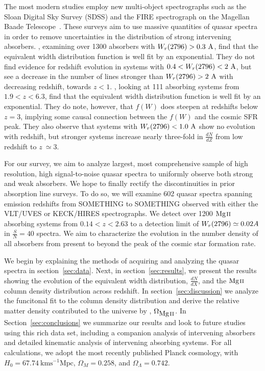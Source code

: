 \documentclass[iop,apj,numberedappendix,appendixfloats,twocolappendix]{emulateapj}
\begin{document}
The most modern studies employ new multi-object spectrographs such as the Sloan Digital Sky Survey (SDSS) and the FIRE spectrograph on the Magellan Baade Telescope~\citep{Nestor2005,Matejek2012}. These surveys aim to use massive quantities of quasar spectra in order to remove uncertainties in the distribution of strong intervening absorbers. \cite{Nestor2005}, examining over 1300 {\MgII} absorbers with $W_r(2796) > 0.3~\mathrm{\AA}$, find that the equivalent width distribution function is well fit by an exponential. They do not find evidence for redshift evolution in systems with $0.4 < W_r(2796) < 2~\mathrm{\AA}$, but see a decrease in the number of lines stronger than $W_r(2796) > 2~\mathrm{\AA}$ with decreasing redshift, towards $z < 1$. \cite{Matejek2012}, looking at 111 {\MgII} absorbing systems from $1.9 < z < 6.3$, find that the equivalent width distribution function is well fit by an exponential. They do note, however, that $f(W)$ does steepen at redshifts below $z = 3$, implying some causal connection between the $f(W)$ and the cosmic SFR peak. They also observe that systems with $W_r(2796) < 1.0~\mathrm{\AA}$ show no evolution with redshift, but stronger systems increase nearly three-fold in $\frac{dN}{dZ}$ from low redshift to $z~\simeq 3$. 

For our survey, we aim to analyze largest, most comprehensive sample of high resolution, high signal-to-noise quasar spectra to uniformly observe both strong and weak {\MgII} absorbers. We hope to finally rectify the discontinuities in prior {\MgII} absorption line surveys. To do so, we will examine 602 quasar spectra spanning emission redshifts from SOMETHING to SOMETHING observed with either the VLT/UVES or KECK/HIRES spectrographs. We detect over 1200 ${\hbox{{\rm Mg}\kern 0.1em{\sc ii}}}$ absorbing systems from $0.14 < z < 2.63$ to a detection limit of $W_r(2796) \simeq 0.02 {\AA}$ in $\frac{S}{N} = 40$ spectra. We aim to characterize the evolution in the number density of all {\MgII} absorbers from present to beyond the peak of the cosmic star formation rate.

We begin by explaining the methods of acquiring and analyzing the quasar spectra in section~\ref{sec:data}. Next, in section~\ref{sec:results}, we present the results showing the evolution of the {\MgII} equivalent width distribution, $\frac{dN}{dX}$, and the ${\hbox{{\rm Mg}\kern 0.1em{\sc ii}}}$ column density distribution across redshift. In section~\ref{sec:discussion} we analyze the funcitonal fit to the column density distribution and derive the relative matter density contributed to the universe by {\MgII}, $\Omega_{\hbox{{\rm Mg}\kern 0.1em{\sc ii}}}$. In Section~\ref{sec:conclusions} we summarize our results and look to future studies using this rich data set, including a companion analysis of intervening {\CIV} absorbers and detailed kinematic analysis of intervening absorbing systems. For all calculations, we adopt the most recently published Planck cosmology, with $H_0 = 67.74~\mathrm{km s^{-1} Mpc}$, $\Omega_M = 0.258$, and $\Omega_{\Lambda} = 0.742$.
\end{document}
